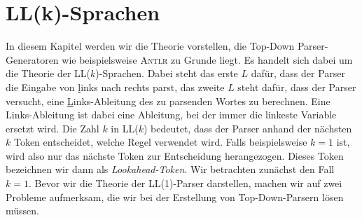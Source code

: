 \chapter{LL(k)-Sprachen}
In diesem Kapitel werden wir die Theorie vorstellen,  die 
Top-Down Parser-Generatoren wie beispielsweise \textsc{Antlr} zu Grunde liegt.  Es handelt
sich dabei um die Theorie der LL($k$)-Sprachen. 
Dabei steht das erste $L$ daf\"ur, dass der Parser die Eingabe von \underline{l}inks nach rechts parst,
das zweite $L$ steht daf\"ur, dass der Parser versucht, eine \underline{L}inks-Ableitung des
zu parsenden Wortes zu berechnen. Eine Links-Ableitung ist dabei eine Ableitung, bei der
immer die linkeste Variable ersetzt wird.
 Die Zahl $k$ in LL($k$) bedeutet, dass der Parser anhand der n\"achsten $k$ Token
entscheidet, welche Regel verwendet wird.  Falls beispielsweise $k=1$ ist, wird also nur das n\"achste 
Token zur Entscheidung herangezogen.  Dieses Token bezeichnen wir dann als \emph{Lookahead-Token}.
Wir betrachten zun\"achst den Fall $k=1$. 
Bevor wir die Theorie der LL(1)-Parser darstellen, machen wir auf zwei Probleme
aufmerksam, die wir bei der Erstellung von Top-Down-Parsern l\"osen m\"ussen.
